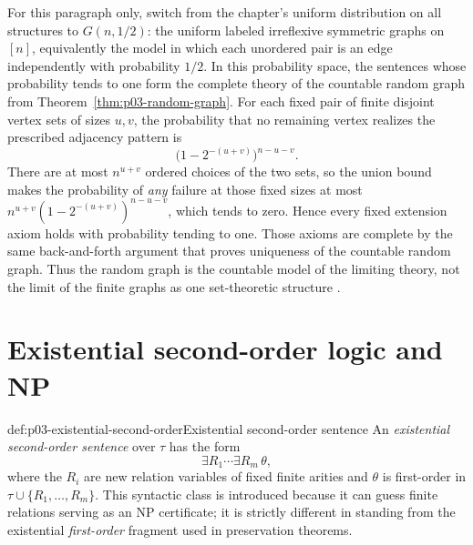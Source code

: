 For this paragraph only, switch from the chapter's uniform distribution on
all structures to \(G(n,1/2)\): the uniform labeled irreflexive symmetric
graphs on \([n]\), equivalently the model in which each unordered pair is an
edge independently with probability \(1/2\).  In this probability space, the
sentences whose probability tends to one form the complete theory of the
countable random graph from
Theorem~\ref{thm:p03-random-graph}.  For each fixed pair of finite disjoint
vertex sets of sizes \(u,v\), the probability that no remaining vertex
realizes the prescribed adjacency pattern is
\[
 \bigl(1-2^{-(u+v)}\bigr)^{n-u-v}.
\]
There are at most \(n^{u+v}\) ordered choices of the two sets, so the union
bound makes the probability of \emph{any} failure at those fixed sizes at
most
\(n^{u+v}(1-2^{-(u+v)})^{n-u-v}\), which tends to zero.  Hence every fixed
extension axiom holds with probability tending to one.  Those axioms are complete by the same
back-and-forth argument that proves uniqueness of the countable random graph.
Thus the random graph is the countable model of the limiting theory, not the
limit of the finite graphs as one set-theoretic structure
\cite{GlebskiiEtAl1969,Fagin1976,Rado1964}.

\section{Existential second-order logic and NP}
\label{sec:p03-fagin-theorem}

\begin{hbdefinition}{def:p03-existential-second-order}{Existential second-order sentence}
An \emph{existential second-order sentence} over \(\tau\) has the form
\[
  \exists R_1\cdots\exists R_m\,\theta,
\]
where the \(R_i\) are new relation variables of fixed finite arities and
\(\theta\) is first-order in \(\tau\cup\{R_1,\ldots,R_m\}\).  This syntactic
class is introduced because it can guess finite relations serving as an NP
certificate; it is strictly different in standing from the existential
\emph{first-order} fragment used in preservation theorems.
\end{hbdefinition}

